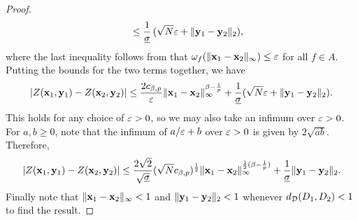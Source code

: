 \documentclass[12pt, twoside]{report}
\begin{document}
\begin{proof}
\begin{align}
        &\qquad \le 
            \frac{1}{\underline{\sigma}}\,
                (\sqrt{N} \varepsilon + \lVert\mathbf{y}_1 - \mathbf{y}_2\rVert_2),
    \end{align}
    where the last inequality follows from that $\omega_f(\lVert\mathbf{x}_1 - \mathbf{x}_2\rVert_\infty) \le \varepsilon$ for all $f \in A$.
    Putting the bounds for the two terms together, we have
    \begin{equation}
        \lvert Z(\mathbf{x}_1, \mathbf{y}_1) - Z(\mathbf{x}_2, \mathbf{y}_2)\rvert
        \le 
            \frac{2 c_{\beta, p}}{\varepsilon} \lVert\mathbf{x}_1 - \mathbf{x}_2\rVert_\infty^{\beta - \frac{1}{p}}
            + \frac{1}{\underline{\sigma}}(\sqrt{N}\varepsilon + \lVert\mathbf{y}_1 - \mathbf{y}_2\rVert_2).
    \end{equation}
    This holds for any choice of $\varepsilon > 0$, so we may also take an infimum over $\varepsilon > 0$.
    For $a,b \ge 0$, note that the infimum of $a/\varepsilon + b$ over $\varepsilon > 0$ is given by $2 \sqrt{a b}$.
    Therefore,
    \begin{equation}
        \lvert Z(\mathbf{x}_1, \mathbf{y}_1) - Z(\mathbf{x}_2, \mathbf{y}_2)\rvert
        \le 
            \frac{2\sqrt{2}}{\sqrt{\underline{\sigma}}}
            (\sqrt{N} c_{\beta,p})^{\frac12}
            \lVert\mathbf{x}_1 - \mathbf{x}_2\rVert_\infty^{\frac12(\beta - \frac1p)}
            + \frac{1}{\underline{\sigma}}\lVert\mathbf{y}_1 - \mathbf{y}_2\rVert_2.
    \end{equation}
    Finally note that $\lVert\mathbf{x}_1 - \mathbf{x}_2\rVert_\infty < 1$ and $\lVert\mathbf{y}_1 - \mathbf{y}_2\rVert_2 < 1$ whenever $d_{\mathcal{D}}(D_1, D_2) <1$ to find the result.
\end{proof}
\end{document}
